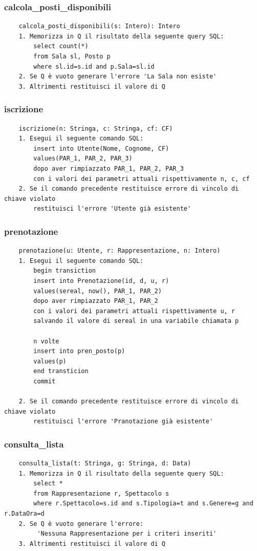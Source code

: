 \documentclass[12pt, letterpaper]{article}
\begin{document}
\subsubsection{calcola\_posti\_disponibili}
\begin{verbatim}
    calcola_posti_disponibili(s: Intero): Intero
    1. Memorizza in Q il risultato della seguente query SQL:
        select count(*)
        from Sala sl, Posto p
        where sl.id=s.id and p.Sala=sl.id
    2. Se Q è vuoto generare l'errore 'La Sala non esiste'
    3. Altrimenti restituisci il valore di Q
\end{verbatim}
\subsubsection{iscrizione}
\begin{verbatim}
    iscrizione(n: Stringa, c: Stringa, cf: CF)
    1. Esegui il seguente comando SQL:
        insert into Utente(Nome, Cognome, CF)
        values(PAR_1, PAR_2, PAR_3)
        dopo aver rimpiazzato PAR_1, PAR_2, PAR_3 
        con i valori dei parametri attuali rispettivamente n, c, cf
    2. Se il comando precedente restituisce errore di vincolo di chiave violato
        restituisci l'errore 'Utente già esistente'
\end{verbatim}
\subsubsection{prenotazione}
\begin{verbatim}
    prenotazione(u: Utente, r: Rappresentazione, n: Intero)
    1. Esegui il seguente comando SQL:
        begin transiction 
        insert into Prenotazione(id, d, u, r)
        values(sereal, now(), PAR_1, PAR_2)
        dopo aver rimpiazzato PAR_1, PAR_2 
        con i valori dei parametri attuali rispettivamente u, r
        salvando il valore di sereal in una variabile chiamata p

        n volte 
        insert into pren_posto(p)
        values(p)
        end transticion 
        commit

    2. Se il comando precedente restituisce errore di vincolo di chiave violato
        restituisci l'errore 'Pranotazione già esistente'

\end{verbatim}
\subsubsection{consulta\_lista}
\begin{verbatim}
    consulta_lista(t: Stringa, g: Stringa, d: Data)
    1. Memorizza in Q il risultato della seguente query SQL:
        select *
        from Rappresentazione r, Spettacolo s
        where r.Spettacolo=s.id and s.Tipologia=t and s.Genere=g and r.DataOra=d
    2. Se Q è vuoto generare l'errore:
         'Nessuna Rappresentazione per i criteri inseriti'
    3. Altrimenti restituisci il valore di Q
\end{verbatim}
\end{document}
